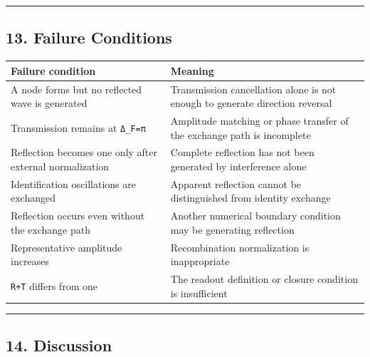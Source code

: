 \documentclass[
  a4paper,
]{article}
\newcounter{none} %
\begin{document}
\begin{center}\rule{0.5\linewidth}{0.5pt}\end{center}

\subsection{13. Failure Conditions}\label{failure-conditions}

{\def\LTcaptype{none} %
\begin{longtable}[]{@{}
  >{\raggedright\arraybackslash}p{}
  >{\raggedright\arraybackslash}p{}@{}}
\toprule\noalign{}
\begin{minipage}[b]{\linewidth}\raggedright
Failure condition
\end{minipage} & \begin{minipage}[b]{\linewidth}\raggedright
Meaning
\end{minipage} \\
\midrule\noalign{}
\endhead
\bottomrule\noalign{}
\endlastfoot
A node forms but no reflected wave is generated & Transmission
cancellation alone is not enough to generate direction reversal \\
Transmission remains at \texttt{Δ\_F=π} & Amplitude matching or phase
transfer of the exchange path is incomplete \\
Reflection becomes one only after external normalization & Complete
reflection has not been generated by interference alone \\
Identification oscillations are exchanged & Apparent reflection cannot
be distinguished from identity exchange \\
Reflection occurs even without the exchange path & Another numerical
boundary condition may be generating reflection \\
Representative amplitude increases & Recombination normalization is
inappropriate \\
\texttt{R+T} differs from one & The readout definition or closure
condition is insufficient \\
\end{longtable}
}

\begin{center}\rule{0.5\linewidth}{0.5pt}\end{center}

\subsection{14. Discussion}\label{discussion}
\end{document}
